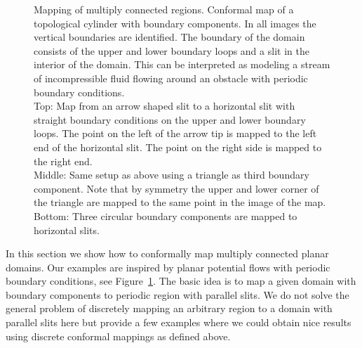 \documentclass[Thesis]{subfiles}
\begin{document}
\begin{figure}
	\centering
\caption{
Mapping of multiply connected regions.
Conformal map of a topological cylinder with boundary components.
In all images the vertical boundaries are identified.
The boundary of the domain consists of the upper and lower boundary loops and a slit in the interior of the domain.
This can be interpreted as modeling a stream of incompressible fluid flowing around an obstacle with periodic boundary conditions.
\\
Top: Map from an arrow shaped slit to a horizontal slit with straight boundary conditions on the upper and lower boundary loops.
The point on the left of the arrow tip is mapped to the left end of the horizontal slit.
The point on the right side is mapped to the right end.
\\
Middle: Same setup as above using a triangle as third boundary component.
Note that by symmetry the upper and lower corner of the triangle are mapped to the same point in the image of the map.
\\
Bottom: Three circular boundary components are mapped to horizontal slits.
}
\label{fig:fluid_flows}
\end{figure}

In this section we show how to conformally map multiply connected planar domains.
Our examples are inspired by planar potential flows with periodic boundary conditions, see Figure~\ref{fig:fluid_flows}.
The basic idea is to map a given domain with boundary components to periodic region with parallel slits.
We do not solve the general problem of discretely mapping an arbitrary region to a domain with parallel slits here but provide a few examples where we could obtain nice results using discrete conformal mappings as defined above.
\end{document}
